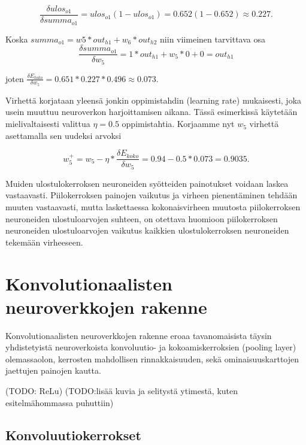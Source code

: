 \documentclass[finnish]{tktltiki2}
\theoremstyle{definition}
\theoremstyle{remark}
\begin{document}
  $$ \frac{\delta ulos_{o1}}{\delta summa_{o1}} = ulos_{o1}(1 - ulos_{o1}) = 0.652(1 - 0.652) \approx 0.227.$$

  Koska $ summa_{o1} = w5 * out_{h1} + w_6 * out_{h2} $ niin viimeinen tarvittava osa 
  $$ \frac{\delta summa_{o1}}{\delta w_5} = 1 * out_{h1} + w_5 * 0 + 0 = out_{h1} $$ 

  joten $\frac{\delta E_{koko}}{\delta w_5} = 0.651 * 0.227 * 0.496 \approx 0.073 $.

  Virhettä korjataan yleensä jonkin oppimistahdin (learning rate) mukaisesti, joka usein muuttuu neuroverkon harjoittamisen aikana. Tässä esimerkissä käytetään mielivaltaisesti valittua $\eta = 0.5$ oppimistahtia. Korjaamme nyt $w_5$ virhettä asettamalla sen uudeksi arvoksi

  $$w_{5}^+ = w_5 - \eta * \frac{\delta E_{koko}}{\delta w_5} = 0.94 - 0.5 * 0.073 = 0.9035.$$

  Muiden ulostulokerroksen neuroneiden syötteiden painotukset voidaan laskea vastaavasti. Piilokerroksen painojen vaikutus ja virheen pienentäminen tehdään muuten vastaavasti, mutta laskettaessa kokonaisvirheen muutosta piilokerroksen neuroneiden ulostuloarvojen suhteen, on otettava huomioon piilokerroksen neuroneiden ulostuloarvojen vaikutus kaikkien ulostulokerroksen neuroneiden tekemään virheeseen.



  
  \section{Konvolutionaalisten neuroverkkojen rakenne}
    Konvolutionaalisten neuroverkkojen rakenne eroaa tavanomaisista täysin yhdistetyistä neuroverkoista konvoluutio- ja kokoamiskerroksien (pooling layer) olemassaolon, kerrosten mahdollisen rinnakkaisuuden, sekä ominaisuuskarttojen jaettujen painojen kautta.   
    
    (TODO: ReLu)
    (TODO:lisää kuvia ja selitystä ytimestä, kuten esitelmähommassa puhuttiin)
    \subsection{Konvoluutiokerrokset}
    
\end{document}
